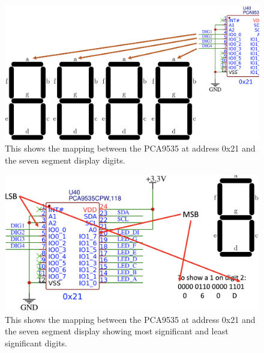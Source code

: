 \begin{figure}[!htb]
	\centering
	\includegraphics[scale=0.2]{i2cgpio/PCA9535-Digs.png}
    \caption{This shows the mapping between the PCA9535 at address 0x21 and 
    the seven segment display digits.}
    \label{fig:PCA9535Digs}
\end{figure}

\begin{figure}[!htb]
	\centering
	\includegraphics[scale=0.2]{i2cgpio/PCA9535-LSB-MSB.png}
    \caption{This shows the mapping between the PCA9535 at address 0x21 and 
    the seven segment display showing most significant and least significant digits.}
    \label{fig:PCA9535LSB}
\end{figure}
